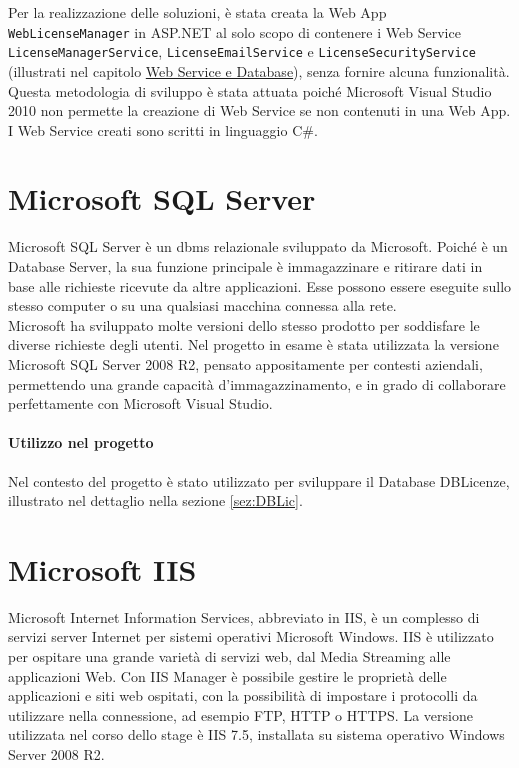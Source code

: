 Per la realizzazione delle soluzioni, è stata creata la Web App \texttt{WebLicenseManager} in ASP.NET al solo scopo di contenere i Web Service \texttt{LicenseManagerService}, \texttt{LicenseEmailService} e \texttt{LicenseSecurityService} (illustrati nel capitolo {\hyperref[cap:sviluppo-software]{Web Service e Database}}), senza fornire alcuna funzionalità. Questa metodologia di sviluppo è stata attuata poiché Microsoft Visual Studio 2010 non permette la creazione di Web Service se non contenuti in una Web App.\\
I Web Service creati sono scritti in linguaggio C\#.

\section{Microsoft SQL Server}

Microsoft SQL Server è un \gls{dbms} relazionale sviluppato da Microsoft. Poiché è un Database Server, la sua funzione principale è immagazzinare e ritirare dati in base alle richieste ricevute da altre applicazioni. Esse possono essere eseguite sullo stesso computer o su una qualsiasi macchina connessa alla rete.
\\
Microsoft ha sviluppato molte versioni dello stesso prodotto per soddisfare le diverse richieste degli utenti. Nel progetto in esame è stata utilizzata la versione Microsoft SQL Server 2008 R2, pensato appositamente per contesti aziendali, permettendo una grande capacità d'immagazzinamento, e in grado di collaborare perfettamente con Microsoft Visual Studio.

\paragraph{Utilizzo nel progetto}

Nel contesto del progetto è stato utilizzato per sviluppare il Database DBLicenze, illustrato nel dettaglio nella sezione \ref{sez:DBLic}.

\section{Microsoft IIS}

Microsoft Internet Information Services, abbreviato in IIS, è un complesso di servizi server Internet per sistemi operativi Microsoft Windows.
IIS è utilizzato per ospitare una grande varietà di servizi web, dal Media Streaming alle applicazioni Web. Con IIS Manager è possibile gestire le proprietà delle applicazioni e siti web ospitati, con la possibilità di impostare i protocolli da utilizzare nella connessione, ad esempio FTP, \gls{HTTP} o \gls{HTTPS}. 
La versione utilizzata nel corso dello stage è IIS 7.5, installata su sistema operativo Windows Server 2008 R2.


